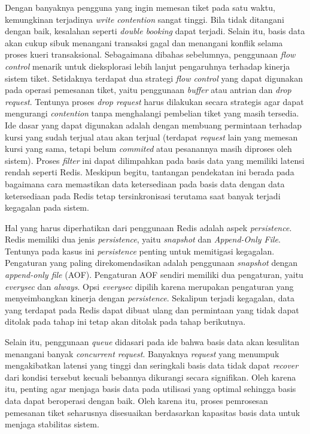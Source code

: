 Dengan banyaknya pengguna yang ingin memesan tiket pada satu waktu, kemungkinan terjadinya \textit{write contention} sangat tinggi. Bila tidak ditangani dengan baik, kesalahan seperti \textit{double booking} dapat terjadi. Selain itu, basis data akan cukup sibuk menangani transaksi gagal dan menangani konflik selama proses kueri transaksional. Sebagaimana dibahas sebelumnya, penggunaan \textit{flow control} menarik untuk dieksplorasi lebih lanjut pengaruhnya terhadap kinerja sistem tiket. Setidaknya terdapat dua strategi \textit{flow control} yang dapat digunakan pada operasi pemesanan tiket, yaitu penggunaan \textit{buffer} atau antrian dan \textit{drop request}. Tentunya proses \textit{drop request} harus dilakukan secara strategis agar dapat mengurangi \textit{contention} tanpa menghalangi pembelian tiket yang masih tersedia. Ide dasar yang dapat digunakan adalah dengan membuang permintaan terhadap kursi yang sudah terjual atau akan terjual (terdapat \textit{request} lain yang memesan kursi yang sama, tetapi belum \textit{commited} atau pesanannya masih diproses oleh sistem). Proses \textit{filter} ini dapat dilimpahkan pada basis data yang memiliki latensi rendah seperti Redis. Meskipun begitu, tantangan pendekatan ini berada pada bagaimana cara memastikan data ketersediaan pada basis data dengan data ketersediaan pada Redis tetap tersinkronisasi terutama saat banyak terjadi kegagalan pada sistem.

Hal yang harus diperhatikan dari penggunaan Redis adalah aspek \textit{persistence}. Redis memiliki dua jenis \textit{persistence}, yaitu \textit{snapshot} dan \textit{Append-Only File}. Tentunya pada kasus ini \textit{persistence} penting untuk memitigasi kegagalan. Pengaturan yang paling direkomendasikan adalah penggunaan \textit{snapshot} dengan \textit{append-only file} (AOF). Pengaturan AOF sendiri memiliki dua pengaturan, yaitu \textit{everysec} dan \textit{always}. Opsi \textit{everysec} dipilih karena merupakan pengaturan yang menyeimbangkan kinerja dengan \textit{persistence}. Sekalipun terjadi kegagalan, data yang terdapat pada Redis dapat dibuat ulang dan permintaan yang tidak dapat ditolak pada tahap ini tetap akan ditolak pada tahap berikutnya.

Selain itu, penggunaan \textit{queue} didasari pada ide bahwa basis data akan kesulitan menangani banyak \textit{concurrent request}. Banyaknya \textit{request} yang menumpuk mengakibatkan latensi yang tinggi dan seringkali basis data tidak dapat \textit{recover} dari kondisi tersebut kecuali bebannya dikurangi secara signifikan. Oleh karena itu, penting agar menjaga basis data pada utilisasi yang optimal sehingga basis data dapat beroperasi dengan baik. Oleh karena itu, proses pemrosesan pemesanan tiket seharusnya disesuaikan berdasarkan kapasitas basis data untuk menjaga stabilitas sistem.

